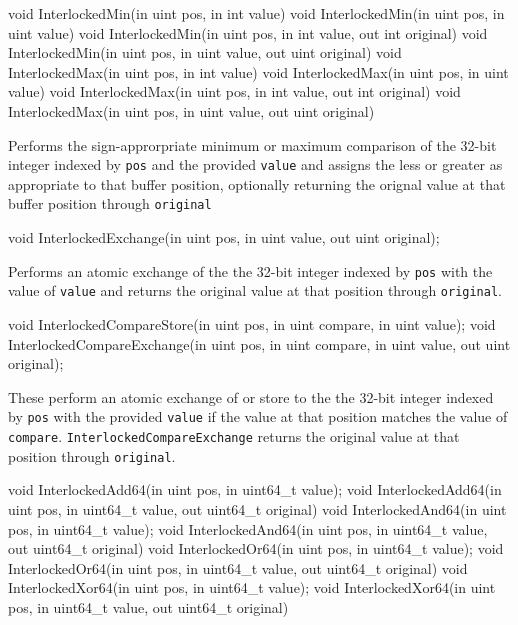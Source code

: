 \begin{HLSL}
   void InterlockedMin(in uint pos, in int value)
   void InterlockedMin(in uint pos, in uint value)
   void InterlockedMin(in uint pos, in int value, out int original)
   void InterlockedMin(in uint pos, in uint value, out uint original)
   void InterlockedMax(in uint pos, in int value)
   void InterlockedMax(in uint pos, in uint value)
   void InterlockedMax(in uint pos, in int value, out int original)
   void InterlockedMax(in uint pos, in uint value, out uint original)
\end{HLSL}

Performs the sign-approrpriate minimum or maximum comparison of the 32-bit integer indexed by \texttt{pos}
and the provided \texttt{value} and assigns the less or greater as appropriate to that buffer position,
optionally returning the orignal value at that buffer position through \texttt{original}

\begin{HLSL}
   void InterlockedExchange(in uint pos, in uint value, out uint original);
\end{HLSL}

Performs an atomic exchange of the the 32-bit integer indexed by \texttt{pos} with
the value of \texttt{value} and returns the original value at that position through \texttt{original}.

\begin{HLSL}
   void InterlockedCompareStore(in uint pos, in uint compare, in uint value);
   void InterlockedCompareExchange(in uint pos, in uint compare, in uint value,
                                    out uint original);
\end{HLSL}

These perform an atomic exchange of or store to the the 32-bit integer indexed by \texttt{pos}
with the provided \texttt{value} if the value at that position matches the value of \texttt{compare}.
\texttt{InterlockedCompareExchange} returns the original value at that position through \texttt{original}.

\begin{HLSL}
   void InterlockedAdd64(in uint pos, in uint64_t value);
   void InterlockedAdd64(in uint pos, in uint64_t value, out uint64_t original)
   void InterlockedAnd64(in uint pos, in uint64_t value);
   void InterlockedAnd64(in uint pos, in uint64_t value, out uint64_t original)
   void InterlockedOr64(in uint pos, in uint64_t value);
   void InterlockedOr64(in uint pos, in uint64_t value, out uint64_t original)
   void InterlockedXor64(in uint pos, in uint64_t value);
   void InterlockedXor64(in uint pos, in uint64_t value, out uint64_t original)
\end{HLSL}


